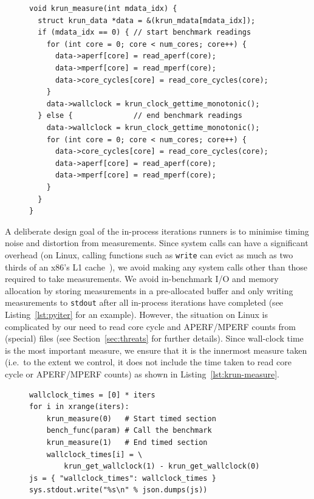 \documentclass[preprint,numbers,10pt]{sigplanconf}
\begin{document}
\begin{figure}[t]
\begin{lstlisting}[label=lst:krun-measure, xleftmargin=0cm,
        caption={%
\texttt{krun\_measure}: Measurements can't be taken atomically, so later
measurements include the time taken to read earlier measurements. Since
wall-clock time is the most important measure, it is innermost; since
the APERF / MPERF ratio is a sanity check, it is outermost. Note that
the APERF / MPERF ratios must be read in the same order both before
and after a benchmark.}]
void krun_measure(int mdata_idx) {
  struct krun_data *data = &(krun_mdata[mdata_idx]);
  if (mdata_idx == 0) { // start benchmark readings
    for (int core = 0; core < num_cores; core++) {
      data->aperf[core] = read_aperf(core);
      data->mperf[core] = read_mperf(core);
      data->core_cycles[core] = read_core_cycles(core);
    }
    data->wallclock = krun_clock_gettime_monotonic();
  } else {              // end benchmark readings
    data->wallclock = krun_clock_gettime_monotonic();
    for (int core = 0; core < num_cores; core++) {
      data->core_cycles[core] = read_core_cycles(core);
      data->aperf[core] = read_aperf(core);
      data->mperf[core] = read_mperf(core);
    }
  }
}
\end{lstlisting}
\end{figure}

A deliberate design goal of the in-process iterations runners is to minimise
timing noise and distortion from measurements. Since system calls can have a
significant overhead (on Linux, calling functions such as \texttt{write} can
evict as much as two thirds of an x86's L1 cache~\cite{soares10flexsc}), we
avoid making any system calls other than those required to take measurements. We
avoid in-benchmark I/O and memory allocation by storing measurements in a
pre-allocated buffer and only writing measurements to \texttt{stdout} after all
in-process iterations have completed (see Listing~\ref{lst:pyiter} for an
example). However, the situation on Linux is complicated by our need to read
core cycle and APERF/MPERF counts from (special) files (see
Section~\ref{sec:threats} for further details). Since wall-clock time
is the most important measure, we ensure that it is the innermost measure taken
(i.e.~to the extent we control, it does not include the time taken to read
core cycle or APERF/MPERF counts) as shown in Listing~\ref{lst:krun-measure}.

\begin{figure}[t]
\begin{lstlisting}[label=lst:pyiter, caption={An elided version of the Python
in-process iterations runner (with core cycles etc. removed).}]
wallclock_times = [0] * iters
for i in xrange(iters):
    krun_measure(0)   # Start timed section
    bench_func(param) # Call the benchmark
    krun_measure(1)   # End timed section
    wallclock_times[i] = \
        krun_get_wallclock(1) - krun_get_wallclock(0)
js = { "wallclock_times": wallclock_times }
sys.stdout.write("%s\n" % json.dumps(js))
\end{lstlisting}
\end{figure}
\end{document}

